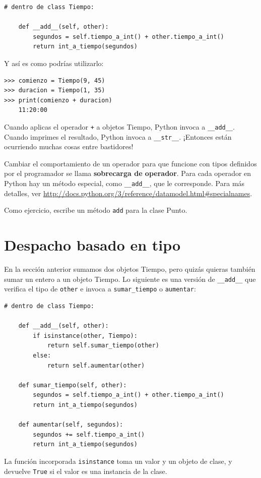 \documentclass[10pt]{book}
\begin{document}
\begin{verbatim}
# dentro de class Tiempo:

    def __add__(self, other):
        segundos = self.tiempo_a_int() + other.tiempo_a_int()
        return int_a_tiempo(segundos)
\end{verbatim}
%
Y así es como podrías utilizarlo:

\begin{verbatim}
>>> comienzo = Tiempo(9, 45)
>>> duracion = Tiempo(1, 35)
>>> print(comienzo + duracion)
    11:20:00
\end{verbatim}
%
Cuando aplicas el operador {\tt +} a objetos Tiempo, Python invoca a
\verb"__add__".  Cuando imprimes el resultado, Python invoca a
\verb"__str__".  ¡Entonces están ocurriendo muchas cosas entre bastidores!

Cambiar el comportamiento de un operador para que funcione con
tipos definidos por el programador se llama {\bf sobrecarga de operador}.  Para cada
operador en Python hay un método especial, como
\verb"__add__", que le corresponde.  Para más detalles, ver
\url{http://docs.python.org/3/reference/datamodel.html#specialnames}.

Como ejercicio, escribe un método {\tt add} para la clase Punto.


\section{Despacho basado en tipo}

En la sección anterior sumamos dos objetos Tiempo, pero quizás
quieras también sumar un entero a un objeto Tiempo.  Lo
siguiente es una versión de \verb"__add__"
que verifica el tipo de {\tt other} e invoca a
\verb"sumar_tiempo" o {\tt aumentar}:

\begin{verbatim}
# dentro de class Tiempo:

    def __add__(self, other):
        if isinstance(other, Tiempo):
            return self.sumar_tiempo(other)
        else:
            return self.aumentar(other)

    def sumar_tiempo(self, other):
        segundos = self.tiempo_a_int() + other.tiempo_a_int()
        return int_a_tiempo(segundos)

    def aumentar(self, segundos):
        segundos += self.tiempo_a_int()
        return int_a_tiempo(segundos)
\end{verbatim}
%
La función incorporada {\tt isinstance} toma un valor y un
objeto de clase, y devuelve {\tt True} si el valor es una instancia
de la clase.
\end{document}
